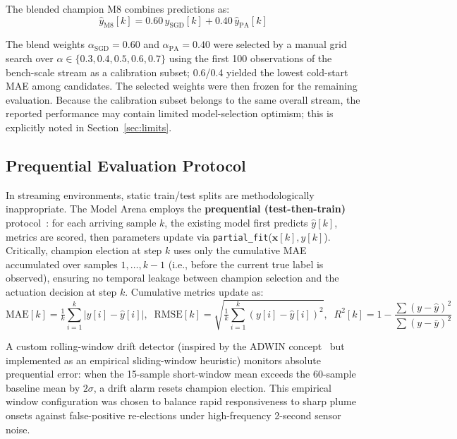 \documentclass[12pt,a4paper]{article}
\begin{document}
The blended champion M8 combines predictions as:
\begin{equation}
\hat{y}_{\mathrm{M8}}[k] = 0.60\,\hat{y}_{\mathrm{SGD}}[k] + 0.40\,\hat{y}_{\mathrm{PA}}[k]
\label{eq:blend}
\end{equation}

\noindent The blend weights $\alpha_{\mathrm{SGD}}=0.60$ and $\alpha_{\mathrm{PA}}=0.40$
were selected by a manual grid search over $\alpha \in \{0.3, 0.4, 0.5, 0.6, 0.7\}$
using the first 100 observations of the bench-scale stream as a calibration subset;
0.6/0.4 yielded the lowest cold-start MAE among candidates. The selected weights were then
frozen for the remaining evaluation. Because the calibration subset belongs to the same
overall stream, the reported performance may contain limited model-selection optimism;
this is explicitly noted in Section~\ref{sec:limits}.

\subsection{Prequential Evaluation Protocol}

In streaming environments, static train/test splits are methodologically inappropriate.
The Model Arena employs the \textbf{prequential (test-then-train)} protocol~\citep{gama2014survey}:
for each arriving sample $k$, the existing model first predicts $\hat{y}[k]$, metrics
are scored, then parameters update via \texttt{partial\_fit}($\mathbf{x}[k], y[k]$).
Critically, champion election at step $k$ uses only the cumulative MAE accumulated over
samples $1, \ldots, k-1$ (i.e., before the current true label is observed), ensuring
no temporal leakage between champion selection and the actuation decision at step $k$.
Cumulative metrics update as:
\begin{equation}
\mathrm{MAE}[k]=\tfrac{1}{k}\sum_{i=1}^k|y[i]-\hat{y}[i]|,\;\;
\mathrm{RMSE}[k]=\sqrt{\tfrac{1}{k}\sum_{i=1}^k(y[i]-\hat{y}[i])^2},\;\;
R^2[k]=1-\frac{\sum(y-\hat{y})^2}{\sum(y-\bar{y})^2}
\label{eq:metrics}
\end{equation}

A custom rolling-window drift detector (inspired by the ADWIN concept~\citep{bifet2007learning}
but implemented as an empirical sliding-window heuristic) monitors absolute prequential error: when the 15-sample
short-window mean exceeds the 60-sample baseline mean by $2\sigma$, a drift alarm resets champion election.
This empirical window configuration was chosen to balance rapid responsiveness to sharp plume onsets against false-positive
re-elections under high-frequency 2-second sensor noise.
\end{document}
